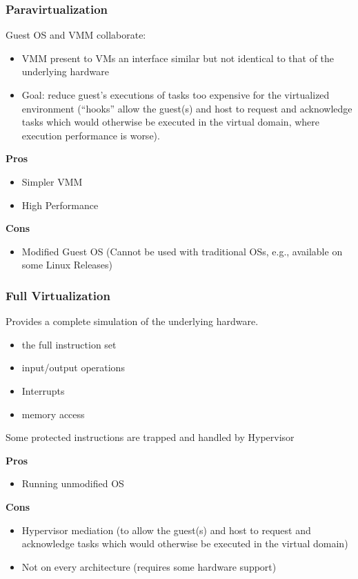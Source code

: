 \documentclass[10pt, oneside]{article}
\begin{document}
\subsubsection{Paravirtualization}
Guest OS and VMM collaborate:\begin{itemize}
    \item VMM present to VMs an interface similar but not identical to
    that of the underlying hardware
    \item Goal: reduce guest’s executions of tasks too expensive for the virtualized environment (“hooks” allow the guest(s) and host to request and acknowledge tasks which would otherwise be executed in the virtual domain, where execution performance is worse).
\end{itemize}
\begin{multicols}{2}
    \noindent
    {\bf \color{green}Pros}\color{black}
    \begin{itemize}
        \item Simpler VMM
        \item High Performance
    \end{itemize}
    \columnbreak
    \noindent
    {\bf \color{red}Cons}\color{black}
    \begin{itemize}
        \item Modified Guest OS
        (Cannot be used with traditional OSs, e.g., available on
        some Linux Releases)
    \end{itemize}
\end{multicols}

\subsubsection{Full Virtualization}
Provides a complete simulation of the underlying hardware.\begin{itemize}
    \item the full instruction set
    \item input/output operations 
    \item Interrupts
    \item memory access
\end{itemize}Some protected instructions are trapped and handled by Hypervisor
\begin{multicols}{2}
    \noindent
    {\bf \color{green}Pros}\color{black}
    \begin{itemize}
        \item Running unmodified OS
    \end{itemize}
    \columnbreak
    \noindent
    {\bf \color{red}Cons}\color{black}
    \begin{itemize}
        \item Hypervisor mediation
        (to allow the guest(s) and host
        to request and acknowledge tasks which would otherwise be executed in the virtual domain)
        \item Not on every architecture (requires some hardware support)
    \end{itemize}
\end{multicols}
\end{document}
